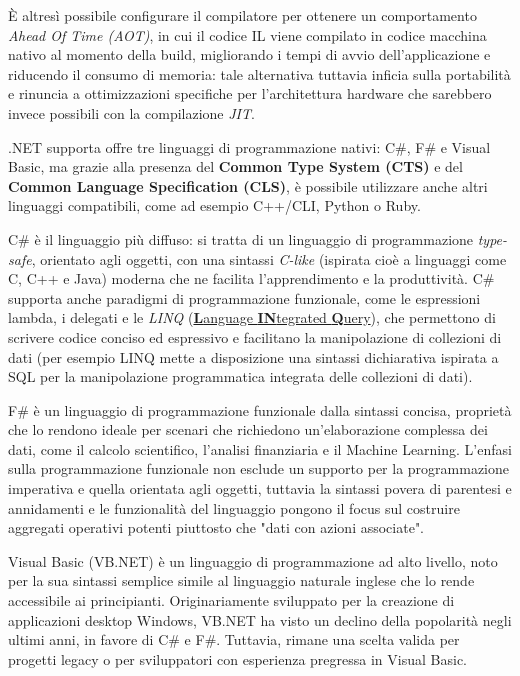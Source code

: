 È altresì possibile configurare il compilatore per ottenere un comportamento \emph{Ahead Of Time (AOT)}, in cui il codice IL viene compilato in codice macchina nativo al momento della build, migliorando i tempi di avvio dell'applicazione e riducendo il consumo di memoria: tale alternativa tuttavia inficia sulla portabilità e rinuncia a ottimizzazioni specifiche per l'architettura hardware che sarebbero invece possibili con la compilazione \emph{JIT}.

.NET supporta offre tre linguaggi di programmazione nativi: C\#, F\# e Visual Basic, ma grazie alla presenza del \textbf{Common Type System (CTS)} e del \textbf{Common Language Specification (CLS)}, è possibile utilizzare anche altri linguaggi compatibili, come ad esempio C++/CLI, Python o Ruby.

C\# è il linguaggio più diffuso: si tratta di un linguaggio di programmazione \emph{type-safe}, orientato agli oggetti, con una sintassi \emph{C-like} (ispirata cioè a linguaggi come C, C++ e Java) moderna che ne facilita l'apprendimento e la produttività.
C\# supporta anche paradigmi di programmazione funzionale, come le espressioni lambda, i delegati e le \emph{LINQ} (\underline{\textbf{L}anguage \textbf{IN}tegrated \textbf{Q}uery}), che permettono di scrivere codice conciso ed espressivo e facilitano la manipolazione di collezioni di dati (per esempio LINQ mette a disposizione una sintassi dichiarativa ispirata a SQL per la manipolazione programmatica integrata delle collezioni di dati).

F\# è un linguaggio di programmazione funzionale dalla sintassi concisa, proprietà che lo rendono ideale per scenari che richiedono un'elaborazione complessa dei dati, come il calcolo scientifico, l'analisi finanziaria e il Machine Learning. L'enfasi sulla programmazione funzionale non esclude un supporto per la programmazione imperativa e quella orientata agli oggetti, tuttavia la sintassi povera di parentesi e annidamenti e le funzionalità del linguaggio pongono il focus sul costruire aggregati operativi potenti piuttosto che "dati con azioni associate".

Visual Basic (VB.NET) è un linguaggio di programmazione ad alto livello, noto per la sua sintassi semplice simile al linguaggio naturale inglese che lo rende accessibile ai principianti. Originariamente sviluppato per la creazione di applicazioni desktop Windows, VB.NET ha visto un declino della popolarità negli ultimi anni, in favore di C\# e F\#. Tuttavia, rimane una scelta valida per progetti legacy o per sviluppatori con esperienza pregressa in Visual Basic.

